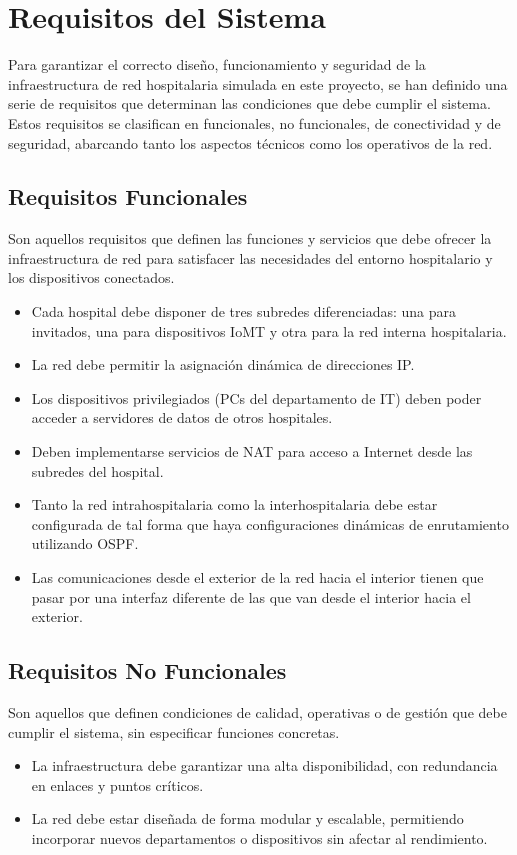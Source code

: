 \section{Requisitos del Sistema}
Para garantizar el correcto diseño, funcionamiento y seguridad de la infraestructura de red hospitalaria simulada en este proyecto, se han definido una serie de requisitos 
que determinan las condiciones que debe cumplir el sistema. Estos requisitos se clasifican en funcionales, no funcionales, de conectividad y de seguridad, abarcando tanto 
los aspectos técnicos como los operativos de la red.

\subsection{Requisitos Funcionales}
Son aquellos requisitos que definen las funciones y servicios que debe ofrecer la infraestructura de red para satisfacer las necesidades del entorno hospitalario y los 
dispositivos conectados.
\begin{itemize}
    \item Cada hospital debe disponer de tres subredes diferenciadas: una para invitados, una para dispositivos IoMT y otra para la red interna hospitalaria.
    \item La red debe permitir la asignación dinámica de direcciones IP.
    \item Los dispositivos privilegiados (\ac{PC}s del departamento de IT) deben poder acceder a servidores de datos de otros hospitales.
    \item Deben implementarse servicios de NAT para acceso a Internet desde las subredes del hospital.
    \item Tanto la red intrahospitalaria como la interhospitalaria debe estar configurada de tal forma que haya configuraciones dinámicas de enrutamiento utilizando OSPF.
    \item Las comunicaciones desde el exterior de la red hacia el interior tienen que pasar por una interfaz diferente de las que van desde el interior hacia el exterior.
\end{itemize}
\subsection{Requisitos No Funcionales}
Son aquellos que definen condiciones de calidad, operativas o de gestión que debe cumplir el sistema, sin especificar funciones concretas.
\begin{itemize}
    \item La infraestructura debe garantizar una alta disponibilidad, con redundancia en enlaces y puntos críticos.
    \item La red debe estar diseñada de forma modular y escalable, permitiendo incorporar nuevos departamentos o dispositivos sin afectar al rendimiento.
\end{itemize}
